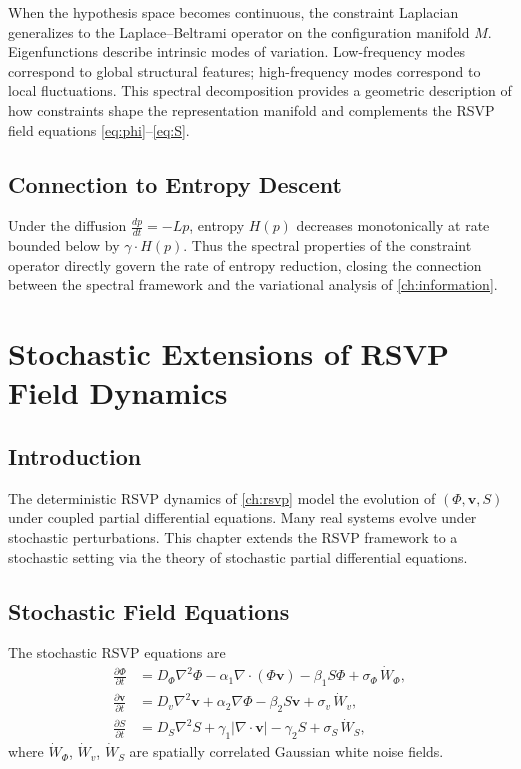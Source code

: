 \documentclass[12pt,a4paper,oneside]{book}
\numberwithin{equation}{chapter}
\theoremstyle{plain}
\theoremstyle{definition}
\theoremstyle{remark}
\begin{document}
When the hypothesis space becomes continuous, the constraint
Laplacian generalizes to the Laplace--Beltrami operator on the
configuration manifold $M$. Eigenfunctions describe intrinsic modes
of variation. Low-frequency modes correspond to global structural
features; high-frequency modes correspond to local fluctuations. This
spectral decomposition provides a geometric description of how
constraints shape the representation manifold and complements the
RSVP field equations \eqref{eq:phi}--\eqref{eq:S}.

\section{Connection to Entropy Descent}

Under the diffusion $\frac{dp}{dt} = -Lp$, entropy $H(p)$ decreases
monotonically at rate bounded below by $\gamma \cdot H(p)$. Thus the
spectral properties of the constraint operator directly govern the
rate of entropy reduction, closing the connection between the spectral
framework and the variational analysis of \cref{ch:information}.


\chapter[Stochastic Extensions of RSVP Dynamics]{Stochastic Extensions of RSVP Field Dynamics}
\label{ch:stochastic-rsvp}

\section{Introduction}

The deterministic RSVP dynamics of \cref{ch:rsvp} model the
evolution of $(\Phi,\mathbf{v},S)$ under coupled partial differential
equations. Many real systems evolve under stochastic perturbations.
This chapter extends the RSVP framework to a stochastic setting via
the theory of stochastic partial differential equations.

\section{Stochastic Field Equations}

The stochastic RSVP equations are
\begin{align}
\frac{\partial\Phi}{\partial t}
&= D_\Phi\nabla^2\Phi - \alpha_1\nabla\cdot(\Phi\mathbf{v})
 - \beta_1 S\Phi + \sigma_\Phi\,\dot{W}_\Phi, \\
\frac{\partial\mathbf{v}}{\partial t}
&= D_v\nabla^2\mathbf{v} + \alpha_2\nabla\Phi - \beta_2 S\mathbf{v}
 + \sigma_v\,\dot{W}_v, \\
\frac{\partial S}{\partial t}
&= D_S\nabla^2 S + \gamma_1|\nabla\cdot\mathbf{v}| - \gamma_2 S
 + \sigma_S\,\dot{W}_S,
\end{align}
where $\dot{W}_\Phi$, $\dot{W}_v$, $\dot{W}_S$ are spatially
correlated Gaussian white noise fields.
\end{document}
